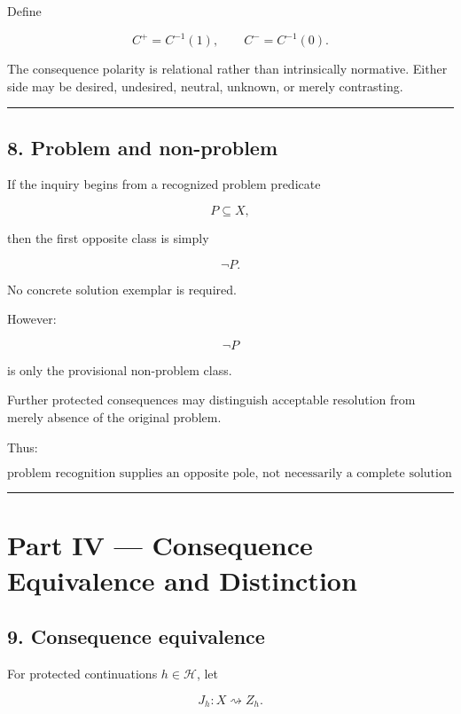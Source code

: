 \documentclass[
]{article}
\begin{document}
Define

\[
C^+=C^{-1}(1),
\qquad
C^-=C^{-1}(0).
\]

The consequence polarity is relational rather than intrinsically
normative. Either side may be desired, undesired, neutral, unknown, or
merely contrasting.

\begin{center}\rule{0.5\linewidth}{0.5pt}\end{center}

\subsection{8. Problem and non-problem}\label{problem-and-non-problem}

If the inquiry begins from a recognized problem predicate

\[
P\subseteq X,
\]

then the first opposite class is simply

\[
\boxed{
\neg P.
}
\]

No concrete solution exemplar is required.

However:

\[
\neg P
\]

is only the provisional non-problem class.

Further protected consequences may distinguish acceptable resolution
from merely absence of the original problem.

Thus:

\[
\boxed{
\text{problem recognition supplies an opposite pole,
not necessarily a complete solution specification.}
}
\]

\begin{center}\rule{0.5\linewidth}{0.5pt}\end{center}

\section{Part IV --- Consequence Equivalence and
Distinction}\label{part-iv-consequence-equivalence-and-distinction}

\subsection{9. Consequence equivalence}\label{consequence-equivalence}

For protected continuations \(h\in\mathcal H\), let

\[
J_h:X\rightsquigarrow Z_h.
\]
\end{document}
